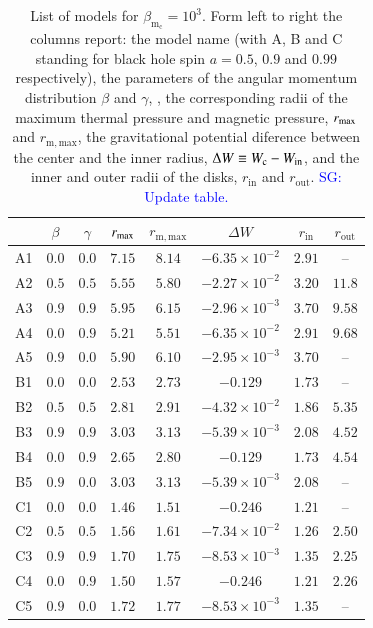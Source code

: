 \documentclass{aa}
\newcommand{\sg}[1]{\textcolor{blue}{SG: #1}}
\begin{document}
\begin{table}
\caption{List of models for $\beta_{\mathrm{m}_{\mathrm{c}}} = 10^{3}
$. Form left to right the columns report: the model name (with A, B and C standing for black hole spin $a = 0.5$, $0.9$ and $0.99$ respectively), the parameters of the angular momentum distribution $\beta$ and $\gamma$, , the corresponding radii of the maximum thermal pressure and magnetic pressure, $r_{{\rm{max}}}$ and $r_{{\mathrm{m, max}}}$, the gravitational potential diference between the center and the inner radius, $\Delta W\equiv W_{\rm c}-W_{\rm in}$, and the inner and outer radii of the disks, $r_{\mathrm{in}}$ and $r_{\mathrm{out}}$. \sg{Update table.}}             
\label{table:1}      
\centering          
\begin{tabular}{c c c c  c c c c}
\hline\hline       
 & $\beta$ & $\gamma$ & $r_{\rm{max}}$ &  $r_{\mathrm{m, max}}$ & $\Delta W$ & $r_{\mathrm{in}}$ & $r_{\mathrm{out}}$ \\ 
\hline           
A1 & $0.0$ & $0.0$ &  $7.15$  & $8.14$ & $-6.35 \times 10^{-2}$ & $2.91$ & -- \\ 
A2 & $0.5$ & $0.5$ & $5.55$ &  $5.80$  & $-2.27 \times 10^{-2}$ & $3.20$ & $11.8$\\ 
A3 & $0.9$ & $0.9$ & $5.95$ &  $6.15$  & $-2.96 \times 10^{-3}$ & $3.70$ &  $9.58$\\ 
A4 & $0.0$ & $0.9$ & $5.21$ &  $5.51$  & $-6.35 \times 10^{-2}$ & $2.91$ & $9.68$\\ 
A5 & $0.9$ & $0.0$ & $5.90$ &  $6.10$  & $-2.95 \times 10^{-3}$ & $3.70$ & --\\ 
 \hline 
B1 & $0.0$ & $0.0$ & $2.53$ &  $2.73$  & $-0.129$ & $1.73$ & -- \\ 
B2 & $0.5$ & $0.5$ & $2.81$ &  $2.91$  & $-4.32 \times 10^{-2}$ & $1.86$ & $5.35$\\ 
B3 & $0.9$ & $0.9$ & $3.03$ &  $3.13$  & $-5.39 \times 10^{-3}$ & $2.08$ & $4.52$\\ 
B4 & $0.0$ & $0.9$ & $2.65$ &  $2.80$  & $-0.129$ & $1.73$ & $4.54$\\ 
B5 & $0.9$ & $0.0$ & $3.03$ &  $3.13$  & $-5.39 \times 10^{-3}$ & $2.08$ & -- \\  
 \hline 
C1 & $0.0$ & $0.0$ & $1.46$ & $1.51$ & $-0.246$ & $1.21$ & -- \\ 
C2 & $0.5$ & $0.5$ & $1.56$ &  $1.61$  & $-7.34 \times 10^{-2}$ & $1.26$ & $2.50$\\ 
C3 & $0.9$ & $0.9$ & $1.70$ &  $1.75$  & $-8.53 \times 10^{-3}$ & $1.35$ & $2.25$\\ 
C4 & $0.0$ & $0.9$ & $1.50$ &  $1.57$  & $-0.246$ & $1.21$ & $2.26$\\ 
C5 & $0.9$ & $0.0$ & $1.72$ &  $1.77$  & $-8.53 \times 10^{-3}$ & $1.35$ & --\\ 
\hline      
\end{tabular}
\end{table}
\end{document}
